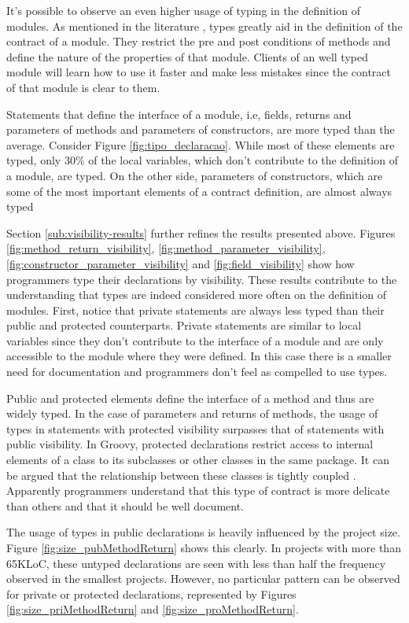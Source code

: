 \documentclass[preprint]{sigplanconf}
\begin{document}
It's possible to observe an even higher usage of typing in the definition of modules.
As mentioned in the literature \cite{Meyer88, Meijer04, Wadler04, Plosch97, Flanagan2006, Furr09}, types greatly aid in the definition of the contract of a module.
They restrict the pre and post conditions of methods and define the nature of the properties of that module.
Clients of an well typed module will learn how to use it faster and make less mistakes since the contract of that module is clear to them.

Statements that define the interface of a module, i.e, fields, returns and parameters of methods and parameters of constructors, are more typed than the average.
Consider Figure \ref{fig:tipo_declaracao}.
While most of these elements are typed, only 30\%  of the local variables, which don't contribute to the definition of a module, are typed. On the other side, parameters of constructors, which are some of the most important elements of a contract definition, are almost always typed

Section \ref{sub:visibility-results} further refines the results presented above.
Figures \ref{fig:method_return_visibility}, \ref{fig:method_parameter_visibility}, \ref{fig:constructor_parameter_visibility} and \ref{fig:field_visibility} show how programmers type their declarations by visibility.
These results contribute to the understanding that types are indeed considered more often on the definition of modules.
First, notice that private statements are always less typed than their public and protected counterparts.
Private statements are similar to local variables since they don't contribute to the interface of a module and are only accessible to the module where they were defined.
In this case there is a smaller need for documentation and programmers don't feel as compelled to use types.

Public and protected elements define the interface of a method and thus are widely typed.
In the case of parameters and returns of methods, the usage of types in statements with protected visibility  surpasses that of statements with public visibility.
In Groovy, protected declarations restrict access to internal elements of a class to its subclasses or other classes in the same package.
It can be argued that the relationship between these classes is tightly coupled \cite{Eder94}.
Apparently programmers understand that this type of contract is more delicate than others and that it should be well document.

The usage of types in public declarations is heavily influenced by the project size.
Figure \ref{fig:size_pubMethodReturn} shows this clearly.
In projects with more than 65KLoC, these untyped declarations are seen with less than half the frequency observed in the smallest projects.
However, no particular pattern can be observed for private or protected declarations, represented by Figures \ref{fig:size_priMethodReturn} and \ref{fig:size_proMethodReturn}.
\end{document}
